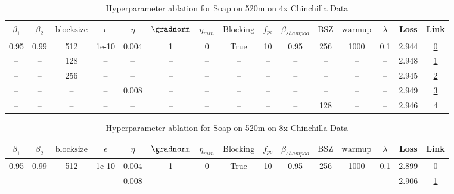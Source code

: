 \begin{table}[H]
\centering
\caption{Hyperparameter ablation for Soap on 520m on 4x Chinchilla Data}
\label{tab:ablation_soap_520m_on_4x_chinchilla_data}
\begin{tabular}{ccccccccccccccc}
\toprule
$\beta_1$ & $\beta_2$ & $\mathrm{block size}$ & $\epsilon$ & $\eta$ & $\gradnorm$ & $\eta_{min}$ & $\mathrm{Blocking}$ & $f_{pc}$ & $\beta_{shampoo}$ & $\mathrm{BSZ}$ & $\mathrm{warmup}$ & $\lambda$ & Loss & Link \\
\midrule
0.95 & 0.99 & 512 & 1e-10 & 0.004 & 1 & 0 & True & 10 & 0.95 & 256 & 1000 & 0.1 & 2.944 & \href{https://wandb.ai/stanford-mercury/optimizer-scaling/runs/sweep-520m-42B-soapepde58c5lr0.004-wd0.1-minlr0-warmup1000-b10.9-c834a4}{0} \\
\midrule
-- & -- & 128 & -- & -- & -- & -- & -- & -- & -- & -- & -- & -- & 2.948 & \href{https://wandb.ai/stanford-mercury/optimizer-scaling/runs/sweep-520m-42B-soapedb348f5lr0.004-wd0.1-minlr0-warmup1000-b10.9-b0ebf2}{1} \\
-- & -- & 256 & -- & -- & -- & -- & -- & -- & -- & -- & -- & -- & 2.945 & \href{https://wandb.ai/stanford-mercury/optimizer-scaling/runs/sweep-520m-42B-soaped5aacdclr0.004-wd0.1-minlr0-warmup1000-b10.9-94f724}{2} \\
-- & -- & -- & -- & 0.008 & -- & -- & -- & -- & -- & -- & -- & -- & 2.949 & \href{https://wandb.ai/stanford-mercury/optimizer-scaling/runs/sweep-520m-42B-soapepef50b6lr0.008-wd0.1-minlr0-warmup1000-b10.9-0c8c99}{3} \\
-- & -- & -- & -- & -- & -- & -- & -- & -- & -- & 128 & -- & -- & 2.946 & \href{https://wandb.ai/stanford-mercury/optimizer-scaling/runs/sweep-520m-42B-soapepa7a19flr0.004-wd0.1-minlr0-warmup1000-b10.9-868eca}{4} \\
\bottomrule
\end{tabular}
\end{table}

\begin{table}[H]
\centering
\caption{Hyperparameter ablation for Soap on 520m on 8x Chinchilla Data}
\label{tab:ablation_soap_520m_on_8x_chinchilla_data}
\begin{tabular}{ccccccccccccccc}
\toprule
$\beta_1$ & $\beta_2$ & $\mathrm{block size}$ & $\epsilon$ & $\eta$ & $\gradnorm$ & $\eta_{min}$ & $\mathrm{Blocking}$ & $f_{pc}$ & $\beta_{shampoo}$ & $\mathrm{BSZ}$ & $\mathrm{warmup}$ & $\lambda$ & Loss & Link \\
\midrule
0.95 & 0.99 & 512 & 1e-10 & 0.004 & 1 & 0 & True & 10 & 0.95 & 256 & 1000 & 0.1 & 2.899 & \href{https://wandb.ai/stanford-mercury/optimizer-scaling/runs/sweep-520m-85B-soapeaa7a19flr0.004-wd0.1-minlr0-warmup1000-b10.9-fe941f}{0} \\
\midrule
-- & -- & -- & -- & 0.008 & -- & -- & -- & -- & -- & -- & -- & -- & 2.906 & \href{https://wandb.ai/stanford-mercury/optimizer-scaling/runs/sweep-520m-85B-soapew298532lr0.008-wd0.1-minlr0-warmup1000-b10.9-59eeb6}{1} \\
\bottomrule
\end{tabular}
\end{table}


